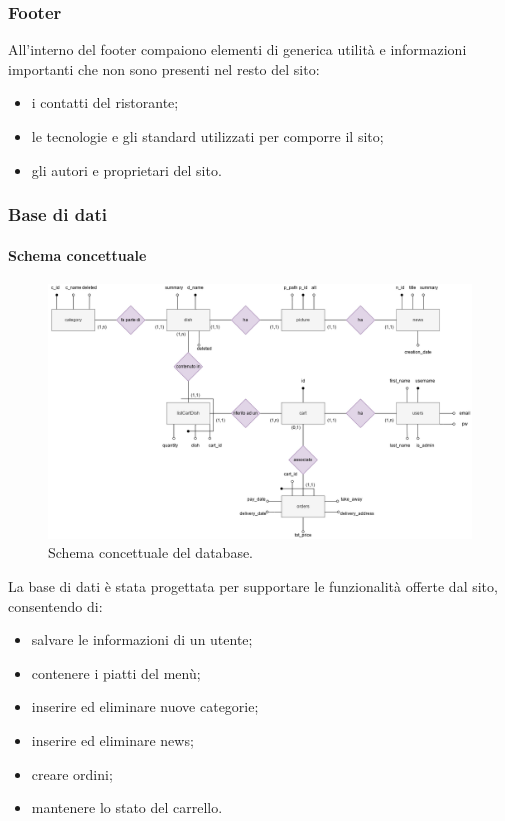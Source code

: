\documentclass{template}
\begin{document}
	\subsubsection{Footer}
	All'interno del footer compaiono elementi di generica utilità e informazioni importanti che non sono presenti nel resto del sito:
	\begin{itemize}
		\item i contatti del ristorante;
		\item le tecnologie e gli standard utilizzati per comporre il sito;
		\item gli autori e proprietari del sito.
	\end{itemize}
	
	\subsubsection{Base di dati}

    \paragraph{Schema concettuale}
	\begin{figure}[H]
		\centering
		\includegraphics[scale=0.3]{src/db_er.png}
		\caption{Schema concettuale del database.}
	\end{figure}

	La base di dati è stata progettata per supportare le funzionalità offerte dal sito, consentendo di:
	\begin{itemize}
		\item salvare le informazioni di un utente;
		\item contenere i piatti del menù;
		\item inserire ed eliminare nuove categorie;
		\item inserire ed eliminare news;
		\item creare ordini;
		\item mantenere lo stato del carrello.
	\end{itemize}
\end{document}
